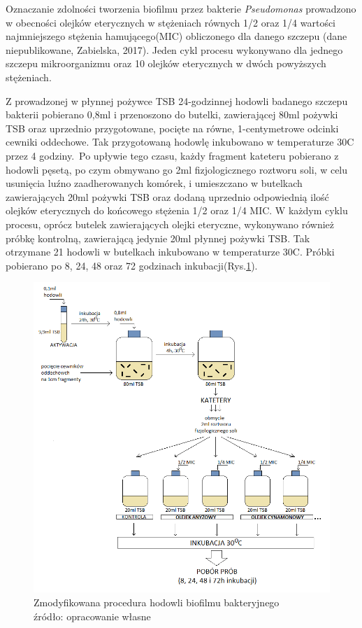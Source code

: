 \documentclass[11pt,a4paper]{report}
\begin{document}
Oznaczanie zdolności tworzenia biofilmu przez bakterie \textit{Pseudomonas} prowadzono w obecności olejków eterycznych w stężeniach równych 1/2 oraz 1/4 wartości najmniejszego stężenia hamującego(MIC) obliczonego dla danego szczepu (dane niepublikowane, Zabielska, 2017).
Jeden cykl procesu wykonywano dla jednego szczepu mikroorganizmu oraz 10 olejków eterycznych w dwóch powyższych stężeniach.\

Z prowadzonej w płynnej pożywce TSB 24-godzinnej hodowli badanego szczepu bakterii pobierano 0,8ml i przenoszono do butelki, zawierającej 80ml pożywki TSB oraz uprzednio przygotowane, pocięte na równe, 1-centymetrowe odcinki cewniki oddechowe.
Tak przygotowaną hodowlę inkubowano w temperaturze 30\degree C przez 4 godziny.\
Po upływie tego czasu, każdy fragment kateteru pobierano z hodowli pęsetą, po czym obmywano go 2ml fizjologicznego roztworu soli, w celu usunięcia luźno zaadherowanych komórek, i umieszczano w butelkach zawierających 20ml pożywki TSB oraz dodaną uprzednio odpowiednią ilość olejków eterycznych do końcowego stężenia 1/2 oraz 1/4 MIC.
W każdym cyklu procesu, oprócz butelek zawierających olejki eteryczne, wykonywano również próbkę kontrolną, zawierającą jedynie 20ml płynnej pożywki TSB.
Tak otrzymane 21 hodowli w butelkach inkubowano w temperaturze 30\degree C.
Próbki pobierano po 8, 24, 48 oraz 72 godzinach inkubacji(Rys.\ref{proces_badawczy}).

\clearpage
\begin{figure}[!h]
\begin{center}
\includegraphics[scale=0.75]{img/mgr_metodyka.png}
\caption{Zmodyfikowana procedura hodowli biofilmu bakteryjnego\\
źródło: opracowanie własne}\label{proces_badawczy}
\end{center} 
\end{figure}
\clearpage
\end{document}
